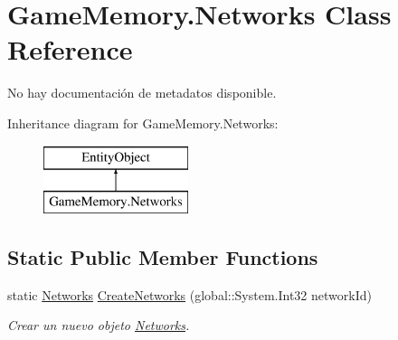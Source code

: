 \hypertarget{class_game_memory_1_1_networks}{\section{Game\-Memory.\-Networks Class Reference}
\label{class_game_memory_1_1_networks}
}


No hay documentación de metadatos disponible.  


Inheritance diagram for Game\-Memory.\-Networks\-:\begin{figure}[H]
\begin{center}
\leavevmode
\includegraphics[height=2.000000cm]{class_game_memory_1_1_networks}
\end{center}
\end{figure}
\subsection*{Static Public Member Functions}
\begin{DoxyCompactItemize}
\item 
static \hyperlink{class_game_memory_1_1_networks}{Networks} \hyperlink{class_game_memory_1_1_networks_a5e6c60874478cc5e562636f623c7e5a9}{Create\-Networks} (global\-::\-System.\-Int32 network\-Id)
\begin{DoxyCompactList}\small\item\em Crear un nuevo objeto \hyperlink{class_game_memory_1_1_networks}{Networks}. \end{DoxyCompactList}\end{DoxyCompactItemize}
